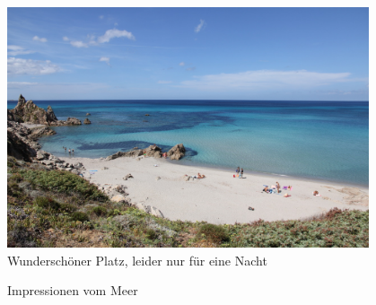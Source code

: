 \begin{figure}[hb]
    \centering
    \includegraphics[width=0.95\textwidth]{../Bilder/Sardinien/26.jpg}
    \caption{Wunderschöner Platz, leider nur für eine Nacht}
    \label{img:Sardinien3}
\end{figure}

\begin{figure}[H]
   \centering
   \quad
   \quad
   \quad
   \caption[Impressionen vom Mee]{Impressionen vom Meer}
\end{figure}

